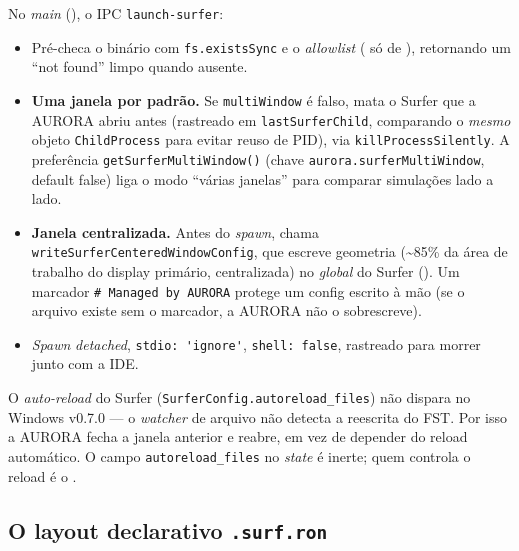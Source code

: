 No \emph{main} (), o IPC \lstinline|launch-surfer|:

\begin{itemize}
  \item Pré-checa o binário com \lstinline|fs.existsSync| e o \emph{allowlist}
        ( só de ), retornando um
        \enquote{not found} limpo quando ausente.
  \item \textbf{Uma janela por padrão.} Se \lstinline|multiWindow| é falso, mata o
        Surfer que a AURORA abriu antes (rastreado em \lstinline|lastSurferChild|,
        comparando o \emph{mesmo} objeto \lstinline|ChildProcess| para evitar reuso
        de PID), via \lstinline|killProcessSilently|. A preferência
        \lstinline|getSurferMultiWindow()| (chave \lstinline|aurora.surferMultiWindow|,
        default false) liga o modo \enquote{várias janelas} para comparar
        simulações lado a lado.
  \item \textbf{Janela centralizada.} Antes do \emph{spawn}, chama
        \lstinline|writeSurferCenteredWindowConfig|, que escreve geometria
        (\textasciitilde85\% da área de trabalho do display primário, centralizada)
        no  \emph{global} do Surfer
        (). Um marcador
        \lstinline|# Managed by AURORA| protege um config escrito à mão (se o
        arquivo existe sem o marcador, a AURORA não o sobrescreve).
  \item \emph{Spawn} \emph{detached}, \lstinline|stdio: 'ignore'|,
        \lstinline|shell: false|, rastreado para morrer junto com a IDE.
\end{itemize}

\begin{nota}
O \emph{auto-reload} do Surfer (\lstinline|SurferConfig.autoreload_files|) não
dispara no Windows v0.7.0 — o \emph{watcher} de arquivo não detecta a reescrita do
FST. Por isso a AURORA fecha a janela anterior e reabre, em vez de depender do
reload automático. O campo \lstinline|autoreload_files| no \emph{state}
 é inerte; quem controla o reload é o .
\end{nota}

\subsection{O layout declarativo \texttt{.surf.ron}}
\label{sec:cap10-surfer-ron}

